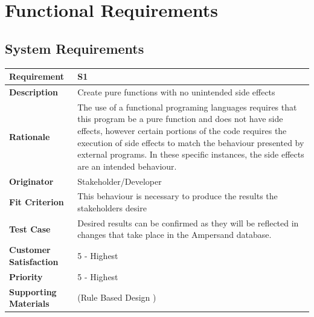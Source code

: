 \documentclass[12pt]{report}
\begin{document}
\section{Functional Requirements}\label{sec:Functional}

\subsection{System Requirements}
{\setlength{\tabcolsep}{6pt} %
    \begin{tabularx}{\textwidth}{>{\bfseries}m{3cm}X}
        Requirement & S1 \\ 
        \midrule
        \endhead
        Description  & Create pure functions with no unintended side effects
        \\	Rationale & The use of a functional programing languages requires 
        that this program be a pure function and does not have side effects, 
        however certain portions of the code requires the execution of side 
        effects to match the behaviour presented by external programs. In these 
        specific instances, the side effects are an intended behaviour.
        \\	Originator & Stakeholder/Developer
        
        \\	Fit Criterion & This behaviour is necessary to produce the results 
        the stakeholders desire
        \\ Test Case & Desired results can be confirmed as they will be 
        reflected in changes that take place in the Ampersand database.
        \\	Customer Satisfaction & 5 - Highest 
        \\	Priority & 5 - Highest 
        \\	Supporting Materials & (Rule Based Design \cite {RBD})
        \vspace{12pt}
    \end{tabularx}
}
\end{document}
